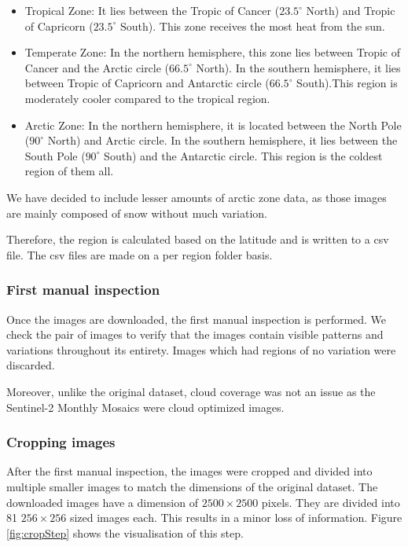 \begin{itemize}
    \item Tropical Zone: It lies between the Tropic of Cancer ($23.5^\circ$ North) and Tropic of Capricorn ($23.5^\circ$ South). This zone receives the most heat from the sun.
    \item Temperate Zone: In the northern hemisphere, this zone lies between Tropic of Cancer and the Arctic circle ($66.5^\circ$ North). In the southern hemisphere, it lies between Tropic of Capricorn and Antarctic circle ($66.5^\circ$ South).This region is moderately cooler compared to the tropical region.
    \item Arctic Zone: In the northern hemisphere, it is located between the North Pole ($90^\circ$ North) and Arctic circle. In the southern hemisphere, it lies between the South Pole ($90^\circ$ South) and the Antarctic circle. This region is the coldest region of them all.
\end{itemize}

We have decided to include lesser amounts of arctic zone data, as those images are mainly composed of snow without much variation.

Therefore, the region is calculated based on the latitude and is written to a csv file. The csv files are made on a per region folder basis.

\subsubsection{First manual inspection}
Once the images are downloaded, the first manual inspection is performed. We check the pair of images to verify that the images contain visible patterns and variations throughout its entirety. Images which had regions of no variation were discarded.

Moreover, unlike the original dataset, cloud coverage was not an issue as the Sentinel-2 Monthly Mosaics were cloud optimized images.

\subsubsection{Cropping images}
After the first manual inspection, the images were cropped and divided into multiple smaller images to match the dimensions of the original dataset. The downloaded images have a dimension of $2500\times2500$ pixels. They are divided into 81 $256\times256$ sized images each. This results in a minor loss of information. Figure \ref{fig:cropStep} shows the visualisation of this step.

